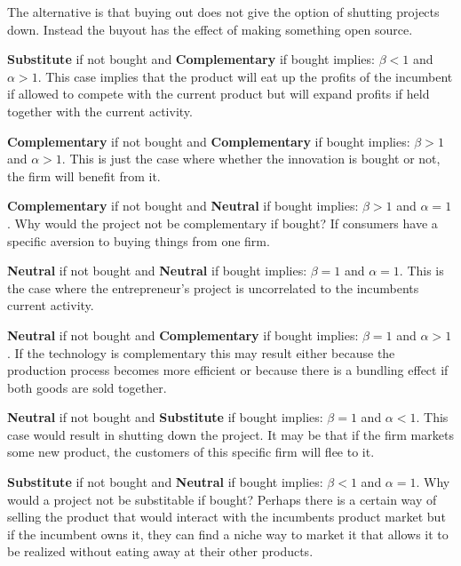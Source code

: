 \documentclass[12pt]{report}
\numberwithin{equation}{section}
\begin{document}
The alternative is that buying out does not give the option of shutting projects down. Instead the buyout has the effect of making something open source. 

\textbf{Substitute}  if not bought and \textbf{Complementary} if bought implies: $\beta<1$ and $\alpha>1$. This case implies that the product will eat up the profits of the incumbent if allowed to compete with the current product but will expand profits if held together with the current activity. 

\textbf{Complementary} if not bought and \textbf{Complementary} if bought implies: $\beta>1$ and $\alpha>1$. This is just the case where whether the innovation is bought or not, the firm will benefit from it.

\textbf{Complementary} if not bought and \textbf{Neutral} if bought implies: $\beta>1$ and $\alpha=1$. Why would the project not be complementary if bought? If consumers have a specific aversion to buying things from one firm. 

\textbf{Neutral} if not bought and \textbf{Neutral} if bought implies: $\beta=1$ and $\alpha=1$. This is the case where the entrepreneur's project is uncorrelated to the incumbents current activity.  

\textbf{Neutral} if not bought and \textbf{Complementary} if bought implies: $\beta=1$ and $\alpha>1$. If the technology is complementary this may result either because the production process becomes more efficient or because there is a bundling effect if both goods are sold together. 

\textbf{Neutral} if not bought and \textbf{Substitute} if bought implies: $\beta=1$ and $\alpha<1$. This case would result in shutting down the project. It may be that if the firm markets some new product, the customers of this specific firm will flee to it. 

\textbf{Substitute} if not bought and \textbf{Neutral} if bought implies: $\beta<1$ and $\alpha=1$. Why would a project not be substitable if bought? Perhaps there is a certain way of selling the product that would interact with the incumbents product market but if the incumbent owns it, they can find a niche way to market it that allows it to be realized without eating away at their other products.




\end{document}

